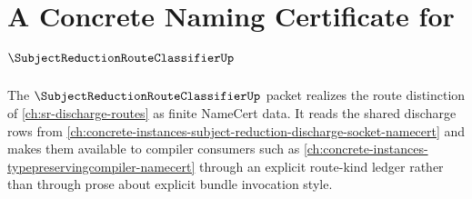 \chapter{A Concrete Naming Certificate for $\SubjectReductionRouteClassifierUp$}
\label{ch:concrete-instances-subject-reduction-route-classifier-namecert}

The $\SubjectReductionRouteClassifierUp$ packet realizes the route distinction of \autoref{ch:sr-discharge-routes} as finite NameCert data. It reads the shared discharge rows from \autoref{ch:concrete-instances-subject-reduction-discharge-socket-namecert} and makes them available to compiler consumers such as \autoref{ch:concrete-instances-typepreservingcompiler-namecert} through an explicit route-kind ledger rather than through prose about explicit bundle invocation style.

